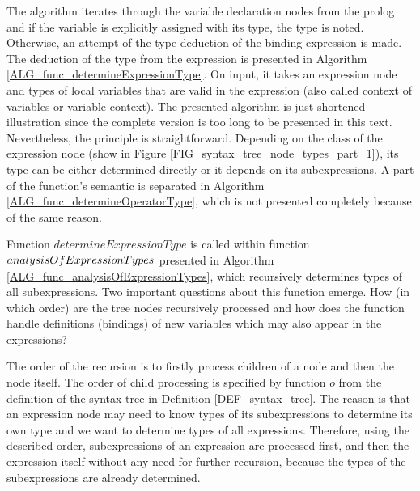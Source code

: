 The algorithm iterates through the variable declaration nodes from the prolog and if the variable is explicitly assigned with its type, the type is noted. Otherwise, an attempt of the type deduction of the binding expression is made. The deduction of the type from the expression is presented in Algorithm \ref{ALG_func_determineExpressionType}. On input, it takes an expression node and types of local variables that are valid in the expression (also called context of variables or variable context). The presented algorithm is just shortened illustration since the complete version is too long to be presented in this text. Nevertheless, the principle is straightforward. Depending on the class of the expression node (show in Figure \ref{FIG_syntax_tree_node_types_part_1}), its type can be either determined directly or it depends on its subexpressions. A part of the function's semantic is separated in Algorithm \ref{ALG_func_determineOperatorType}, which is not presented completely because of the same reason.

Function $determineExpressionType$ is called within function $analysis\-Of\-Expression\-Types$ presented in Algorithm \ref{ALG_func_analysisOfExpressionTypes}, which recursively determines types of all subexpressions. Two important questions about this function emerge. How (in which order) are the tree nodes recursively processed and how does the function handle definitions (bindings) of new variables which may also appear in the expressions?

The order of the recursion is to firstly process children of a node and then the node itself. The order of child processing is specified by function $o$ from the definition of the syntax tree in Definition \ref{DEF_syntax_tree}. The reason is that an expression node may need to know types of its subexpressions to determine its own type and we want to determine types of all expressions. Therefore, using the described order, subexpressions of an expression are processed first, and then the expression itself without any need for further recursion, because the types of the subexpressions are already determined.

